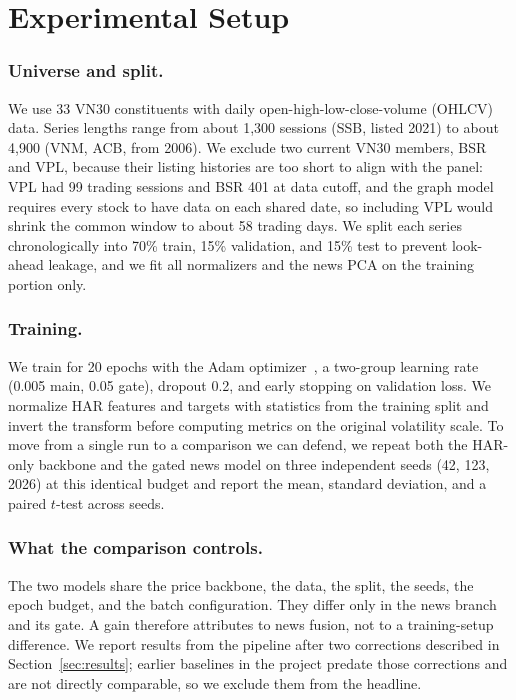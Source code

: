 \documentclass[runningheads]{llncs}
\newcommand{\ntick}{33}
\begin{document}
\section{Experimental Setup}
\label{sec:setup}

\subsubsection{Universe and split.}
We use \ntick{} VN30 constituents with daily open-high-low-close-volume (OHLCV) data. Series lengths range from about 1{,}300
sessions (SSB, listed 2021) to about 4{,}900 (VNM, ACB, from 2006). We exclude two current VN30
members, BSR and VPL, because their listing histories are too short to align with the panel: VPL
had 99 trading sessions and BSR 401 at data cutoff, and the graph model requires every stock to
have data on each shared date, so including VPL would shrink the common window to about 58 trading
days. We split each series chronologically into 70\% train, 15\% validation, and 15\% test to
prevent look-ahead leakage, and we fit all normalizers and the news PCA on the training portion
only.

\subsubsection{Training.}
We train for 20 epochs with the Adam optimizer~\cite{kingma2015}, a two-group learning rate (0.005
main, 0.05 gate), dropout 0.2, and early stopping on validation loss. We normalize HAR features and
targets with statistics from the training split and invert the transform before computing metrics
on the original volatility scale. To move from a single run to a comparison we can defend, we repeat
both the HAR-only backbone and the gated news model on three independent seeds (42, 123, 2026) at
this identical budget and report the mean, standard deviation, and a paired $t$-test across seeds.

\subsubsection{What the comparison controls.}
The two models share the price backbone, the data, the split, the seeds, the epoch budget, and the
batch configuration. They differ only in the news branch and its gate. A gain therefore attributes
to news fusion, not to a training-setup difference. We report results from the pipeline after two
corrections described in Section~\ref{sec:results}; earlier baselines in the project predate those
corrections and are not directly comparable, so we exclude them from the headline.
\end{document}

